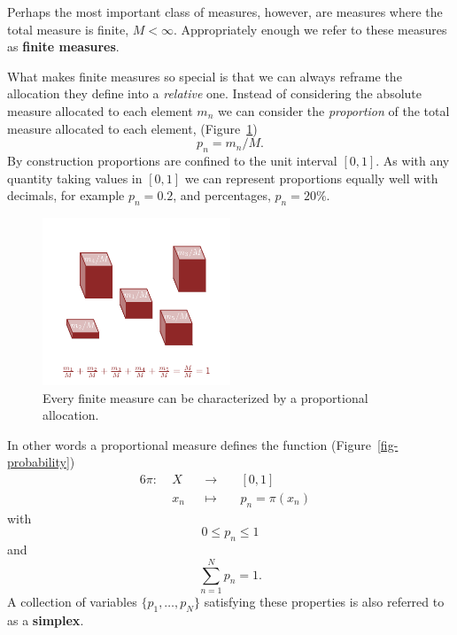 \documentclass[
  letterpaper,
  DIV=11,
  numbers=noendperiod]{scrartcl}
\begin{document}
Perhaps the most important class of measures, however, are measures
where the total measure is finite, \(M < \infty\). Appropriately enough
we refer to these measures as \textbf{finite measures}.

What makes finite measures so special is that we can always reframe the
allocation they define into a \emph{relative} one. Instead of
considering the absolute measure allocated to each element \(m_{n}\) we
can consider the \emph{proportion} of the total measure allocated to
each element, (Figure~\ref{fig-proportional}) \[
p_{n} = m_{n} / M.
\] By construction proportions are confined to the unit interval
\([0, 1]\). As with any quantity taking values in \([0, 1]\) we can
represent proportions equally well with decimals, for example
\(p_{n} = 0.2\), and percentages, \(p_{n} = 20\%\).

\begin{figure}

{\centering \includegraphics[width=0.5\textwidth,height=\textheight]{figures/proportional_measure/proportional_measure.pdf}

}

\caption{\label{fig-proportional}Every finite measure can be
characterized by a proportional allocation.}

\end{figure}

In other words a proportional measure defines the function
(Figure~\ref{fig-probability}) \begin{alignat*}{6}
\pi :\; & X & &\rightarrow& \; & [0, 1] &
\\
& x_{n} & &\mapsto& & p_{n} = \pi(x_{n}) &
\end{alignat*} with \[
0 \le p_{n} \le 1
\] and \[
\sum_{n = 1}^{N} p_{n} = 1.
\] A collection of variables \(\{ p_{1}, \ldots, p_{N} \}\) satisfying
these properties is also referred to as a \textbf{simplex}.
\end{document}
